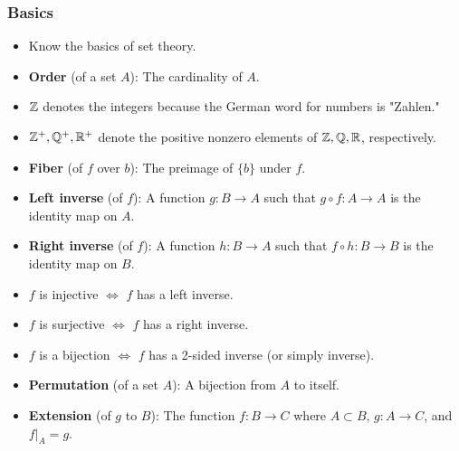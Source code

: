 \documentclass[../main.tex]{subfiles}
\begin{document}
\subsubsection{Basics}
\begin{itemize}
    \item {}Know the basics of set theory.
    \item \textbf{Order} (of a set $A$): The cardinality of $A$.
    \item $\mathbb{Z}$ denotes the integers because the German word for numbers is "Zahlen."
    \item $\mathbb{Z}^+,\mathbb{Q}^+,\mathbb{R}^+$ denote the positive nonzero elements of $\mathbb{Z},\mathbb{Q},\mathbb{R}$, respectively.
    \item \textbf{Fiber} (of $f$ over $b$): The preimage of $\{b\}$ under $f$.
    \item \textbf{Left inverse} (of $f$): A function $g:B\to A$ such that $g\circ f:A\to A$ is the identity map on $A$.
    \item \textbf{Right inverse} (of $f$): A function $h:B\to A$ such that $f\circ h:B\to B$ is the identity map on $B$.
    \item {}$f$ is injective $\Longleftrightarrow$ $f$ has a left inverse.
    \item $f$ is surjective $\Longleftrightarrow$ $f$ has a right inverse.
    \item $f$ is a bijection $\Longleftrightarrow$ $f$ has a 2-sided inverse (or simply inverse).
    \item \textbf{Permutation} (of a set $A$): A bijection from $A$ to itself.
    \item \textbf{Extension} (of $g$ to $B$): The function $f:B\to C$ where $A\subset B$, $g:A\to C$, and $f|_A=g$.
\end{itemize}
\end{document}
